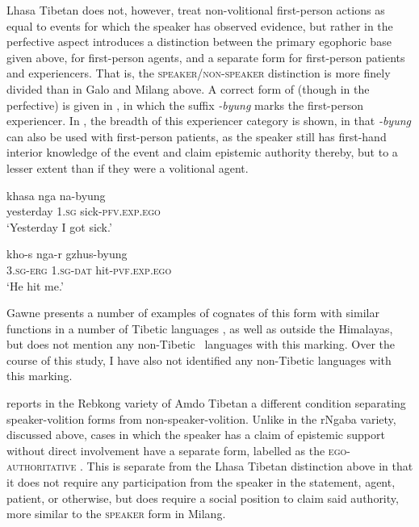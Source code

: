 Lhasa Tibetan does not, however, treat non-volitional first-person actions as equal to events for which the speaker has observed evidence, but rather in the perfective aspect introduces a distinction between the primary egophoric base given above, for first-person agents, and a separate form for first-person patients and experiencers. That is, the \textsc{speaker}/\textsc{non-speaker} distinction is more finely divided than in Galo and Milang above. A correct form of  (though in the perfective) is given in , in which the suffix \textit{-byung} marks the first-person experiencer. In , the breadth of this experiencer category is shown, in that \textit{-byung} can also be used with first-person patients, as the speaker still has first-hand interior knowledge of the event and claim epistemic authority thereby, but to a lesser extent than if they were a volitional agent.

\begin{exe}
        \ex
        \begin{xlist}
                \ex\label{e:Description:LhasaEgoErgExperiencer}
                \gll khasa nga na-byung \\
                yesterday \textsc{1.sg} sick-\textsc{pfv.exp.ego} \\
                \glt `Yesterday I got sick.' \cite[Lhasa Tibetan,][169]{Garrett2001}

                \ex\label{e:Description:LhasaEgoAbsExperiencer}
                \gll kho-s nga-r gzhus-byung \\
                \textsc{3.sg-erg} \textsc{1.sg-dat} hit-\textsc{pvf.exp.ego} \\
                \glt `He hit me.' \cite[Lhasa Tibetan,][395]{DeLancey2017Tibetan}
        \end{xlist}
\end{exe}

Gawne presents a number of examples of cognates of this form with similar functions  in a number of Tibetic languages , as well as outside the Himalayas, but does not mention any non-Tibetic \lfam\ languages with this marking. Over the course of this study, I have also not identified any non-Tibetic languages with this marking.

 reports in the Rebkong variety of Amdo Tibetan a different condition separating speaker-volition forms from non-speaker-volition. Unlike in the rNgaba variety, discussed above, cases in which the speaker has a claim of epistemic support without direct involvement have a separate form, labelled as the \textsc{ego-authoritative} \cite[300]{Simon2021}. This is separate from the Lhasa Tibetan distinction above in that it does not require any participation from the speaker in the statement, agent, patient, or otherwise, but does require a social position to claim said authority, more similar to the \textsc{speaker} form in Milang.

